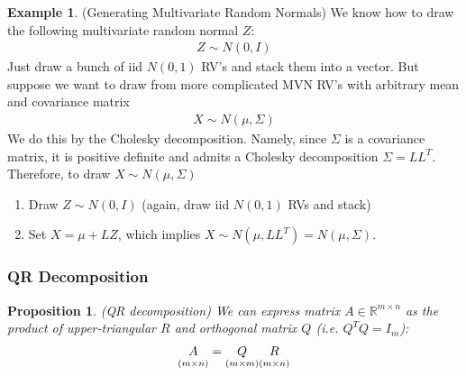 \documentclass[12pt]{article}
\numberwithin{equation}{section} %
\theoremstyle{plain}
\newtheorem{prop}[thm]{Proposition}
\theoremstyle{definition}
\newtheorem{ex}[thm]{Example}
\theoremstyle{remark}
\newcommand{\Rmn}{\mathbb{R}^{m\times n}}
\begin{document}
\begin{ex}(Generating Multivariate Random Normals)
We know how to draw the following multivariate random normal $Z$:
\begin{align*}
  Z \sim N(0,I)
\end{align*}
Just draw a bunch of iid $N(0,1)$ RV's and stack them into a vector.
But suppose we want to draw from more complicated MVN RV's with
arbitrary mean and covariance matrix
\begin{align*}
  X \sim N(\mu, \Sigma)
\end{align*}
We do this by the Cholesky decomposition. Namely, since $\Sigma$ is a
covariance matrix, it is positive definite and admits a Cholesky
decomposition $\Sigma=LL^T$. Therefore, to draw $X\sim N(\mu,\Sigma)$
\begin{enumerate}
  \item Draw $Z\sim N(0,I)$ (again, draw iid $N(0,1)$ RVs and stack)
  \item Set $X=\mu+LZ$, which implies $X\sim N(\mu,LL^T)=N(\mu,\Sigma)$.
\end{enumerate}
\end{ex}

\subsubsection{QR Decomposition}


\begin{prop}\emph{(QR decomposition)}
We can express matrix $A\in\Rmn$ as the product of upper-triangular $R$
and orthogonal matrix $Q$ (i.e. $Q^TQ=I_m$):
\begin{align*}
  \underset{(m\times n)}{A\vphantom{Q}}
  =
  \underset{(m\times m)}{Q}
  \underset{(m\times n)}{R\vphantom{Q}}
\end{align*}
\end{prop}
\end{document}
